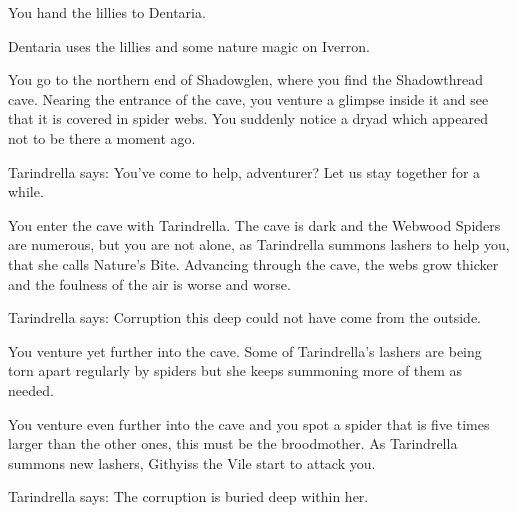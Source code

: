 
You hand the lillies to Dentaria.


Dentaria uses the lillies and some nature magic on Iverron.



You go to the northern end of Shadowglen, where you find the Shadowthread cave. Nearing the entrance of the cave, you venture a glimpse inside it and see that it is covered in spider webs. You suddenly notice a dryad which appeared not to be there a moment ago. %

Tarindrella says: You've come to help, adventurer? Let us stay together for a while.



You enter the cave with Tarindrella. The cave is dark and the Webwood Spiders are numerous, but you are not alone, as Tarindrella summons lashers to help you, that she calls Nature's Bite. Advancing through the cave, the webs grow thicker and the foulness of the air is worse and worse. %

Tarindrella says: Corruption this deep could not have come from the outside.

You venture yet further into the cave. Some of Tarindrella's lashers are being torn apart regularly by spiders but she keeps summoning more of them as needed.



You venture even further into the cave and you spot a spider that is five times larger than the other ones, this must be the broodmother. As Tarindrella summons new lashers, Githyiss the Vile start to attack you.

Tarindrella says: The corruption is buried deep within her.

